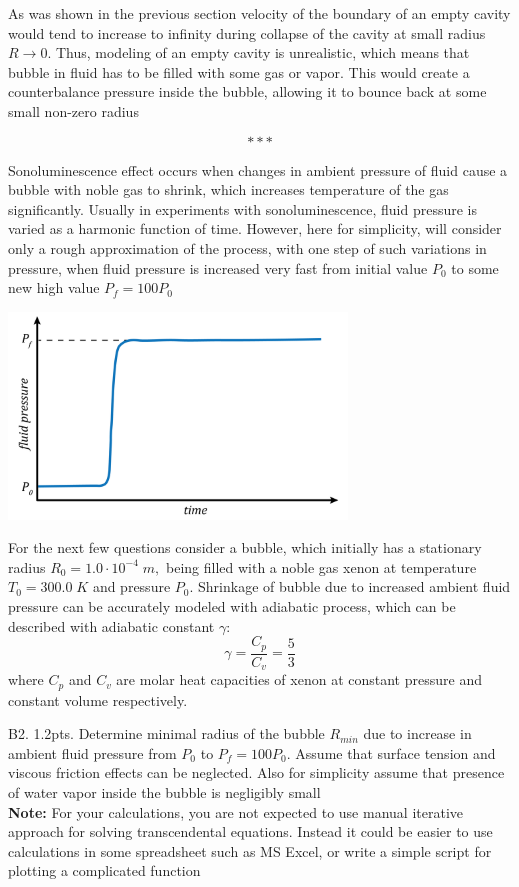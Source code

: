 \begin{problem}{}
As was shown in the previous section velocity of the boundary of an empty cavity would tend to increase to infinity during collapse of the cavity at small radius ${R\!\rightarrow\! 0}.$ Thus, modeling of an empty cavity is unrealistic, which means that bubble in fluid has to be filled with some gas or vapor. This would create a counterbalance pressure inside the bubble, allowing it to bounce back at some small non-zero radius

$$	***  $$

Sonoluminescence effect occurs when changes in ambient pressure of fluid cause a bubble with noble gas to shrink, which increases temperature of the gas significantly. Usually in experiments with sonoluminescence, fluid pressure is varied as a harmonic function of time. However, here for simplicity, will consider only a rough approximation of the process, with one step of such variations in pressure, when fluid pressure is increased very fast from initial value ${P_0}$ to some new high value  ${P_f = 100P_0}$

\begin{center}
\includegraphics[width=9cm]{Images/7_bbl_theory_velocity_too_high1.PNG}
\end{center}

For the next few questions consider a bubble, which initially has a stationary radius ${R_0 = 1.0\cdot 10^{-4}\;m},$ being filled with a noble gas xenon at temperature ${T_0 = 300.0\;K}$ and pressure ${P_0}$. Shrinkage of bubble due to increased ambient fluid pressure can be accurately modeled with adiabatic process, which can be described with adiabatic constant ${\gamma}$:
$$\gamma = \frac{C_p}{C_v} = \frac{5}{3}$$
where ${C_p}$ and ${C_v}$ are molar heat capacities of xenon at constant pressure and constant volume respectively.
\end{problem}
\begin{subpr}{B2. \hfill 1.2pts.} Determine minimal radius of the bubble ${R_{min}}$ due to increase in ambient fluid pressure from ${P_0}$ to ${P_f = 100P_0}.$ Assume that surface tension and viscous friction effects can be neglected. Also for simplicity assume that presence of water vapor inside the bubble is negligibly small\\
\textbf{Note:}
For your calculations, you are not expected to use manual iterative approach for solving transcendental equations. Instead it could be easier to use calculations in some spreadsheet such as MS Excel, or write a simple script for plotting a complicated function
\end{subpr}

